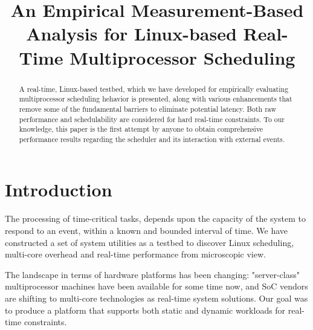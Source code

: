 \documentclass[conference]{IEEEtran}
\begin{document}
\title{An Empirical Measurement-Based Analysis for Linux-based Real-Time Multiprocessor Scheduling}

\author{ 
\and {} }

\maketitle

\begin{abstract}
A real-time, Linux-based testbed, which we have developed for empirically evaluating multiprocessor
scheduling hehavior is presented, along with various enhancements that remove some of the fundamental
barriers to eliminate potential latency. Both raw performance and schedulability are considered for
hard real-time constraints. To our knowledge, this paper is the first attempt by anyone to obtain
comprehensive performance results regarding the scheduler and its interaction with external events.
\end{abstract}

\section{Introduction}

The processing of time-critical tasks, depends upon the capacity of the system to respond to an event, within
a known and bounded interval of time. We have constructed a set of system utilities as a testbed to discover
Linux scheduling, multi-core overhead and real-time performance from microscopic view.

The landscape in terms of hardware platforms has been changing: "server-class" multiprocessor machines have
been available for some time now, and SoC vendors are shifting to multi-core technologies as real-time system
solutions. Our goal was to produce a platform that supports both static and dynamic workloads for real-time constraints.
\end{document}
